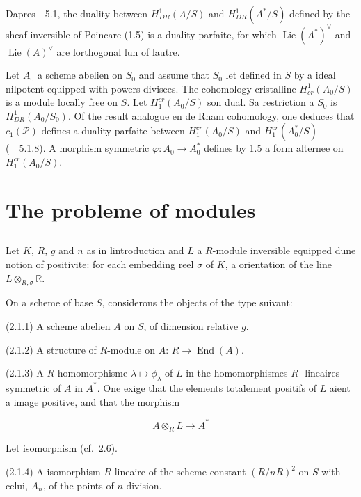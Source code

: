 \documentclass[11pt,a4paper]{article}
\theoremstyle{plain}
\theoremstyle{definition}
\DeclareMathOperator{\End}{End}
\DeclareMathOperator{\Lie}{Lie}
\begin{document}
Dapres~\cite{BerthelotBreenMessing}~5.1, the duality between $H^1_{DR}(A/S)$ and $H^1_{DR}(A^*/S)$ defined by the
sheaf inversible of Poincare (1.5) is a duality parfaite, for which
$\Lie(A^*)^\vee$ and $\Lie(A)^\vee$ are lorthogonal lun of lautre.

Let $A_0$ a scheme abelien on $S_0$ and assume that $S_0$ let defined in $S$
by a ideal nilpotent equipped with powers divisees. The cohomology cristalline
$H^1_{cr}(A_0/S)$ is a module locally free on $S$. Let $H^{cr}_1(A_0/S)$ son dual. Sa
restriction a $S_0$ is $H^1_{DR}(A_0/S_0)$. Of the result analogue en de Rham cohomology, one deduces that $c_1(\mathscr{P})$ defines a duality parfaite between $H^{cr}_1(A_0/S)$ and
$H^{cr}_1(A^*_0/S)$ (~\cite{BerthelotBreenMessing}~5.1.8). A morphism symmetric $\varphi: A_0 \to A^*_0$ defines by 1.5 a
form alternee on $H^{cr}_1(A_0/S)$.

\section{The probleme of modules}

\subsection{}

Let $K$, $R$, $g$ and $n$ as in lintroduction and $L$ a $R$-module inversible
equipped dune notion of positivite: for each embedding reel $\sigma$ of $K$, a
orientation of the line $L \otimes_{R,\sigma} \mathbb{R}$.

On a scheme of base $S$, considerons the objects of the type suivant:

(2.1.1) A scheme abelien $A$ on $S$, of dimension relative $g$.

(2.1.2) A structure of $R$-module on $A$: $R \to \End(A)$.

(2.1.3) A $R$-homomorphisme $\lambda \mapsto \phi_\lambda$ of $L$ in the homomorphismes $R$-
lineaires symmetric of $A$ in $A^*$. One exige that the elements totalement
positifs of $L$ aient a image positive, and that the morphism

\begin{equation}\label{eq:2.1.3}
A \otimes_R L \longrightarrow A^*
\end{equation}

Let isomorphism (cf.~2.6).

(2.1.4) A isomorphism $R$-lineaire of the scheme constant $(R/nR)^2$ on $S$ with
celui, $A_n$, of the points of $n$-division.
\end{document}
